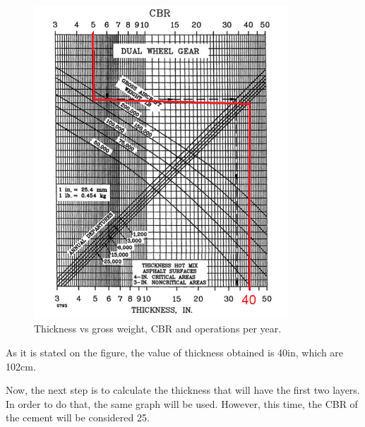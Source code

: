 		\begin{figure}[H]
			\centering
			\includegraphics[clip, trim=0cm 0cm 0cm 0cm, width=0.85\textwidth]{./images/pavement/B737/thickness}
			\caption{Thickness vs gross weight, CBR and operations per year.}
			\label{} %
		\end{figure}
		
		As it is stated on the figure, the  value of thickness obtained is 40in, which are 102cm. 
		
		Now, the next step is to calculate the thickness that will have the first two layers. In order to do that, the same graph will be used. However, this time, the CBR of the cement will be considered 25. 
		

